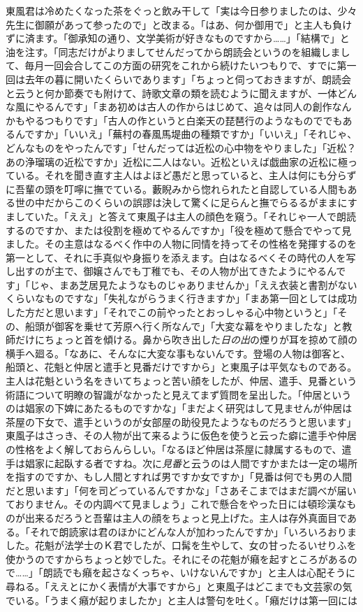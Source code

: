 \documentclass[12pt, openright]{book}
\begin{document}
東風君は冷めたくなった茶をぐっと飲み干して「実は今日参りましたのは、少々先生に御願があって参ったので」と改まる。「はあ、何か御用で」と主人も負けずに済ます。「御承知の通り、文学美術が好きなものですから\ldots{}\ldots{}」「結構で」と油を注す。「同志だけがよりましてせんだってから朗読会というのを組織しまして、毎月一回会合してこの方面の研究をこれから続けたいつもりで、すでに第一回は去年の暮に開いたくらいであります」「ちょっと伺っておきますが、朗読会と云うと何か節奏でも附けて、詩歌文章の類を読むように聞えますが、一体どんな風にやるんです」「まあ初めは古人の作からはじめて、追々は同人の創作なんかもやるつもりです」「古人の作というと白楽天の琵琶行のようなものででもあるんですか」「いいえ」「蕪村の春風馬堤曲の種類ですか」「いいえ」「それじゃ、どんなものをやったんです」「せんだっては近松の心中物をやりました」「近松？ あの浄瑠璃の近松ですか」近松に二人はない。近松といえば戯曲家の近松に極っている。それを聞き直す主人はよほど愚だと思っていると、主人は何にも分らずに吾輩の頭を叮嚀に撫でている。藪睨みから惚れられたと自認している人間もある世の中だからこのくらいの誤謬は決して驚くに足らんと撫でらるるがままにすましていた。「ええ」と答えて東風子は主人の顔色を窺う。「それじゃ一人で朗読するのですか、または役割を極めてやるんですか」「役を極めて懸合でやって見ました。その主意はなるべく作中の人物に同情を持ってその性格を発揮するのを第一として、それに手真似や身振りを添えます。白はなるべくその時代の人を写し出すのが主で、御嬢さんでも丁稚でも、その人物が出てきたようにやるんです」「じゃ、まあ芝居見たようなものじゃありませんか」「ええ衣装と書割がないくらいなものですな」「失礼ながらうまく行きますか」「まあ第一回としては成功した方だと思います」「それでこの前やったとおっしゃる心中物というと」「その、船頭が御客を乗せて芳原へ行く所なんで」「大変な幕をやりましたな」と教師だけにちょっと首を傾ける。鼻から吹き出した\emph{日の出}の煙りが耳を掠めて顔の横手へ廻る。「なあに、そんなに大変な事もないんです。登場の人物は御客と、船頭と、花魁と仲居と遣手と見番だけですから」と東風子は平気なものである。主人は花魁という名をきいてちょっと苦い顔をしたが、仲居、遣手、見番という術語について明瞭の智識がなかったと見えてまず質問を呈出した。「仲居というのは娼家の下婢にあたるものですかな」「まだよく研究はして見ませんが仲居は茶屋の下女で、遣手というのが女部屋の助役見たようなものだろうと思います」東風子はさっき、その人物が出て来るように仮色を使うと云った癖に遣手や仲居の性格をよく解しておらんらしい。「なるほど仲居は茶屋に隷属するもので、遣手は娼家に起臥する者ですね。次に\emph{見番}と云うのは人間ですかまたは一定の場所を指すのですか、もし人間とすれば男ですか女ですか」「見番は何でも男の人間だと思います」「何を司どっているんですかな」「さあそこまではまだ調べが届いておりません。その内調べて見ましょう」これで懸合をやった日には頓珍漢なものが出来るだろうと吾輩は主人の顔をちょっと見上げた。主人は存外真面目である。「それで朗読家は君のほかにどんな人が加わったんですか」「いろいろおりました。花魁が法学士のＫ君でしたが、口髯を生やして、女の甘ったるいせりふを使かうのですからちょっと妙でした。それにその花魁が癪を起すところがあるので\ldots{}\ldots{}」「朗読でも癪を起さなくっちゃ、いけないんですか」と主人は心配そうに尋ねる。「ええとにかく表情が大事ですから」と東風子はどこまでも文芸家の気でいる。「うまく癪が起りましたか」と主人は警句を吐く。「癪だけは第一回には
\end{document}

